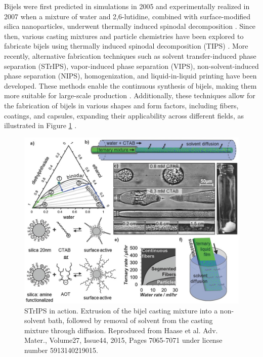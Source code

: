 Bijels were first predicted in simulations in 2005 and experimentally realized in 2007 when a mixture of water and 2,6-lutidine, combined with 
surface-modified silica nanoparticles, underwent thermally induced spinodal decomposition \cite{stratford_colloidal_2005, herzig_bicontinuous_2007}. 
Since then, various casting mixtures and particle chemistries have been explored to fabricate bijels using thermally induced spinodal decomposition (TIPS) 
\cite{lee_bicontinuous_2010, bai_dynamics_2015}. More recently, alternative fabrication techniques such as solvent transfer-induced phase separation (STrIPS), 
vapor-induced phase separation (VIPS), non-solvent-induced phase separation (NIPS), homogenization, and liquid-in-liquid printing have been developed. 
These methods enable the continuous synthesis of bijels, making them more suitable for large-scale production 
\cite{haase_continuous_2015, wang_scalable_2020, cai_bijels_2017, yabuno_preparation_2020, wang_bicontinuous_2023, amirfattahi_fabrication_2024}. 
Additionally, these techniques allow for the fabrication of bijels in various shapes and form factors, including fibers, coatings, and capsules, expanding 
their applicability across different fields, as illustrated in Figure \ref{fig:strips} 
\cite{haase_continuous_2015, boakye-ansah_controlling_2020, kharal_hightensile_2020, wang_bicontinuous_2023}.  

\begin{figure}[h]
    \centering
    \includegraphics[scale = 5]{figures/introduction/STrIPS.jpg}
    \caption{STrIPS in action. Extrusion of the bijel casting mixture into a non-solvent bath, followed by removal of solvent from 
             the casting mixture through diffusion. \cite{haase_continuous_2015} Reproduced from Haase et al. Adv. Mater., 
             Volume27, Issue44, 2015, Pages 7065-7071 under license number 5913140219015. }
    \label{fig:strips}
\end{figure}

